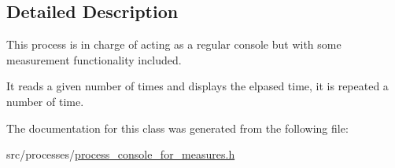 \subsection{Detailed Description}
This process is in charge of acting as a regular console but with some measurement functionality included. 

It reads a given number of times and displays the elpased time, it is repeated a number of time. 

The documentation for this class was generated from the following file\-:\begin{DoxyCompactItemize}
\item 
src/processes/\hyperlink{process__console__for__measures_8h}{process\-\_\-console\-\_\-for\-\_\-measures.\-h}\end{DoxyCompactItemize}

